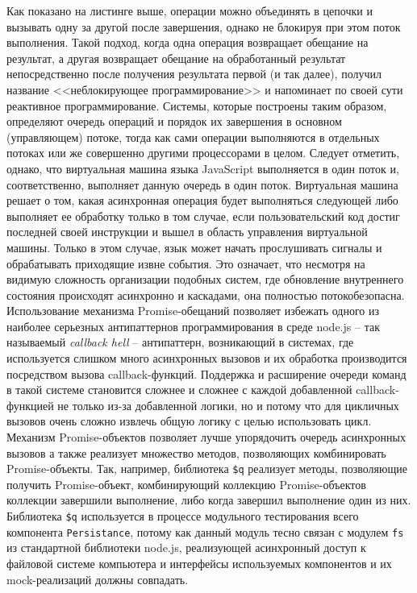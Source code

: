 Как показано на листинге выше, операции можно объединять в цепочки и вызывать одну за другой после завершения, однако не блокируя при этом поток выполнения. Такой подход,
когда одна операция возвращает обещание на результат, а другая возвращает обещание на обработанный результат непосредственно после получения результата первой (и так далее),
получил название <<неблокирующее программирование>> и напоминает по своей сути реактивное программирование. Системы, которые построены таким образом, определяют очередь
операций и порядок их завершения в основном (управляющем) потоке, тогда как сами операции выполняются в отдельных потоках или же совершенно другими процессорами в целом.
Следует отметить, однако, что виртуальная машина языка JavaScript выполняется в один поток и, соответственно, выполняет данную очередь в один поток. Виртуальная машина
решает о том, какая асинхронная операция будет выполняться следующей либо выполняет ее обработку только в том случае, если пользовательский код достиг последней своей
инструкции и вышел в область управления виртуальной машины. Только в этом случае, язык может начать прослушивать сигналы и обрабатывать приходящие извне события. Это
означает, что несмотря на видимую сложность организации подобных систем, где обновление внутреннего состояния происходят асинхронно и каскадами, она полностью
потокобезопасна.
Использование механизма Promise-обещаний позволяет избежать одного из наиболее серьезных антипаттернов программирования в среде node.js -- так
называемый \textit{callback hell} -- антипаттерн, возникающий в системах, где используется слишком много асинхронных вызовов и их обработка производится
посредством вызова callback-функций. Поддержка и расширение очереди команд в такой системе становится сложнее и сложнее с каждой добавленной callback-функцией 
не только из-за добавленной логики, но и потому что для цикличных вызовов очень сложно извлечь общую логику с целью использовать цикл. Механизм Promise-объектов
позволяет лучше упорядочить очередь асинхронных вызовов а также реализует множество методов, позволяющих комбинировать Promise-объекты. Так, например,
библиотека \texttt{\$q} реализует методы, позволяющие получить Promise-объект, комбинирующий коллекцию Promise-объектов коллекции завершили выполнение, либо когда
завершил выполнение один из них. Библиотека \texttt{\$q} используется в процессе модульного тестирования всего компонента \texttt{Persistance}, потому как данный модуль
тесно связан с модулем \texttt{fs} из стандартной библиотеки node.js, реализующей асинхронный доступ к файловой системе компьютера и интерфейсы используемых компонентов
и их mock-реализаций должны совпадать.

